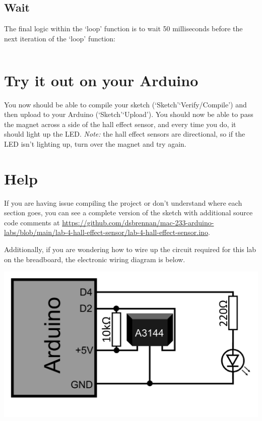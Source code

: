 \documentclass[11pt,a4paper]{article}
\begin{document}
\subsection{Wait}
The final logic within the `loop' function is to wait 50 milliseconds before the next iteration of the `loop' function:\\
\vspace{-1.75em}
\inputminted{arduino}{./src/8-loop-sleep.txt}
\vspace{.75em}

\section*{Try it out on your Arduino}
You now should be able to compile your sketch (`Sketch'\textrightarrow `Verify/Compile') and then upload to your Arduino (`Sketch'\textrightarrow `Upload'). You should now be able to pass the magnet across a side of the hall effect sensor, and every time you do, it should light up the LED. \textit{Note:} the hall effect sensors are directional, so if the LED isn't lighting up, turn over the magnet and try again.

\pagebreak
\section*{Help}
If you are having issue compiling the project or don't understand where each section goes, you can see a complete version of the sketch with additional source code comments at \url{https://github.com/dsbrennan/mac-233-arduino-labs/blob/main/lab-4-hall-effect-sensor/lab-4-hall-effect-sensor.ino}.

\begin{center}
\end{center}

\vspace{2em}

\noindent
Additionally, if you are wondering how to wire up the circuit required for this lab on the breadboard, the electronic wiring diagram is below.

\begin{center}
    \includegraphics[width=.6\textwidth]{./images/wiring-diagram.png}
\end{center}
\end{document}
